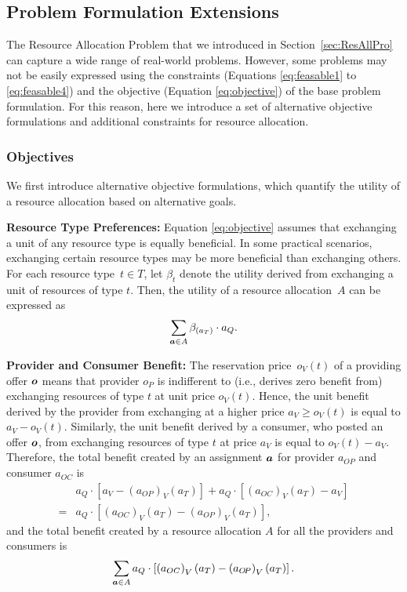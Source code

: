 \subsection{Problem Formulation Extensions}
\label{sec:ProForExt}

The Resource Allocation Problem that we introduced in Section~\ref{sec:ResAllPro} can capture a wide range of real-world problems.
However, some problems may not be easily expressed using the constraints (Equations \eqref{eq:feasable1} to \eqref{eq:feasable4}) and the objective (Equation \eqref{eq:objective}) of the base problem formulation.
For this reason, here we introduce a set of alternative objective formulations and additional constraints for resource allocation. 

\subsubsection{Objectives}
\label{sec:extObj}

We first introduce alternative objective formulations, which quantify the utility of a resource allocation based on alternative goals.

\textbf{Resource Type Preferences:}
Equation \eqref{eq:objective} assumes that exchanging a unit of any resource type is equally beneficial.
In some practical scenarios, exchanging certain resource types may be more beneficial than exchanging others.
For each resource type~$t \in T$, let $\beta_t$ denote the utility derived from exchanging a unit of resources of type $t$.
Then, the utility of a resource allocation~$A$ can be expressed as
\begin{equation}
    \sum_{\boldsymbol{a} \in A} \beta_{\left(a_T\right)} \cdot a_Q .
\end{equation}

\textbf{Provider and Consumer Benefit:}
The reservation price~$o_V(t)$ of a providing offer $\boldsymbol{o}$ means that provider $o_P$ is indifferent to (i.e., derives zero benefit from) exchanging resources of type $t$ at unit price $o_V(t)$.
Hence, the unit benefit derived by the provider from exchanging at a higher price $a_V \geq o_V(t)$ is equal to $a_V - o_V(t)$.
Similarly, the unit benefit derived by a consumer, who posted an offer $\boldsymbol{o}$, from exchanging resources of type $t$ at price $a_V$ is equal to $o_V(t) - a_V$.
Therefore, the total benefit created by an assignment $\boldsymbol{a}$ for provider $a_{O\!P}$ and consumer $a_{OC}$ is
\begin{align}
    & a_Q \cdot \left[ a_V - \left(a_{O\!P}\right)_V(a_T) \right] + a_Q \cdot \left[ \left(a_{OC}\right)_V(a_T) - a_V \right] \nonumber \\
    = & a_Q \cdot \left[ \left(a_{OC}\right)_V(a_T) - \left(a_{O\!P}\right)_V(a_T) \right] ,
\end{align}
and the total benefit created by a resource allocation $A$ for all the providers and consumers is
\begin{equation}
    \sum_{\boldsymbol{a} \in A}  a_Q \cdot \left[ \left(a_{OC}\right)_V(a_T) - \left(a_{O\!P}\right)_V(a_T) \right] .
\end{equation}

